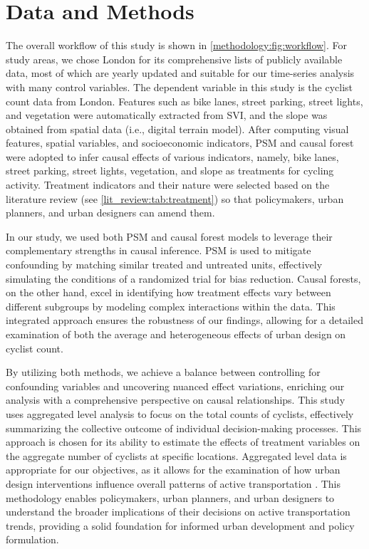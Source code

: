 \documentclass[preprint,12pt, authoryear]{elsarticle}
\begin{document}
\section{Data and Methods} \label{sc:data_method}
The overall workflow of this study is shown in \autoref{methodology:fig:workflow}. For study areas, we chose London for its comprehensive lists of publicly available data, most of which are yearly updated and suitable for our time-series analysis with many control variables. The dependent variable in this study is the cyclist count data from London. Features such as bike lanes, street parking, street lights, and vegetation were automatically extracted from SVI, and the slope was obtained from spatial data (i.e., digital terrain model). After computing visual features, spatial variables, and socioeconomic indicators, PSM and causal forest were adopted to infer causal effects of various indicators, namely, bike lanes, street parking, street lights, vegetation, and slope as treatments for cycling activity. Treatment indicators and their nature were selected based on the literature review (see \autoref{lit_review:tab:treatment}) so that policymakers, urban planners, and urban designers can amend them.

In our study, we used both PSM and causal forest models to leverage their complementary strengths in causal inference.
PSM is used to mitigate confounding by matching similar treated and untreated units, effectively simulating the conditions of a randomized trial for bias reduction.
Causal forests, on the other hand, excel in identifying how treatment effects vary between different subgroups by modeling complex interactions within the data. This integrated approach ensures the robustness of our findings, allowing for a detailed examination of both the average and heterogeneous effects of urban design on cyclist count.

By utilizing both methods, we achieve a balance between controlling for confounding variables and uncovering nuanced effect variations, enriching our analysis with a comprehensive perspective on causal relationships.
This study uses aggregated level analysis to focus on the total counts of cyclists, effectively summarizing the collective outcome of individual decision-making processes. This approach is chosen for its ability to estimate the effects of treatment variables on the aggregate number of cyclists at specific locations. Aggregated level data is appropriate for our objectives, as it allows for the examination of how urban design interventions influence overall patterns of active transportation \citep{molenberg_systematic_2019, xiao_impacts_2022, xiao_design_2023, tait_build_2024}. This methodology enables policymakers, urban planners, and urban designers to understand the broader implications of their decisions on active transportation trends, providing a solid foundation for informed urban development and policy formulation.
\end{document}
